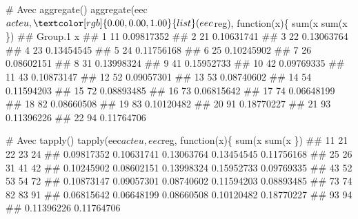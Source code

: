 \documentclass[12pt,twosided, notitlepage]{book}
\newenvironment{Shaded}{}{}
\newcommand{\KeywordTok}[1]{\textcolor[rgb]{0.00,0.00,1.00}{#1}}
\newcommand{\DataTypeTok}[1]{#1}
\newcommand{\StringTok}[1]{\textcolor[rgb]{0.00,0.50,0.50}{#1}}
\newcommand{\CommentTok}[1]{\textcolor[rgb]{0.00,0.50,0.00}{#1}}
\newcommand{\OtherTok}[1]{\textcolor[rgb]{1.00,0.25,0.00}{#1}}
\newcommand{\ControlFlowTok}[1]{\textcolor[rgb]{0.00,0.00,1.00}{#1}}
\newcommand{\OperatorTok}[1]{#1}
\newcommand{\NormalTok}[1]{#1}
\renewenvironment{Shaded}{\begin{snugshade}}{\end{snugshade}}
\begin{document}
\begin{enumerate}
\begin{enumerate}
\begin{Shaded}
\begin{Highlighting}[]
\CommentTok{# Avec aggregate()}
\KeywordTok{aggregate}\NormalTok{(eec}\OperatorTok{$}\NormalTok{acteu, }\KeywordTok{list}\NormalTok{(eec}\OperatorTok{$}\NormalTok{reg), }\ControlFlowTok{function}\NormalTok{(x)\{}
  \KeywordTok{sum}\NormalTok{(x }\OperatorTok{%
\StringTok{    }\KeywordTok{sum}\NormalTok{(x }\OperatorTok{%
\NormalTok{\})}
\NormalTok{  ##    Group.1          x}
\NormalTok{  ## 1       11 0.09817352}
\NormalTok{  ## 2       21 0.10631741}
\NormalTok{  ## 3       22 0.13063764}
\NormalTok{  ## 4       23 0.13454545}
\NormalTok{  ## 5       24 0.11756168}
\NormalTok{  ## 6       25 0.10245902}
\NormalTok{  ## 7       26 0.08602151}
\NormalTok{  ## 8       31 0.13998324}
\NormalTok{  ## 9       41 0.15952733}
\NormalTok{  ## 10      42 0.09769335}
\NormalTok{  ## 11      43 0.10873147}
\NormalTok{  ## 12      52 0.09057301}
\NormalTok{  ## 13      53 0.08740602}
\NormalTok{  ## 14      54 0.11594203}
\NormalTok{  ## 15      72 0.08893485}
\NormalTok{  ## 16      73 0.06815642}
\NormalTok{  ## 17      74 0.06648199}
\NormalTok{  ## 18      82 0.08660508}
\NormalTok{  ## 19      83 0.10120482}
\NormalTok{  ## 20      91 0.18770227}
\NormalTok{  ## 21      93 0.11396226}
\NormalTok{  ## 22      94 0.11764706}

\CommentTok{# Avec tapply()}
\KeywordTok{tapply}\NormalTok{(eec}\OperatorTok{$}\NormalTok{acteu, eec}\OperatorTok{$}\NormalTok{reg, }\ControlFlowTok{function}\NormalTok{(x)\{}
  \KeywordTok{sum}\NormalTok{(x }\OperatorTok{%
\StringTok{    }\KeywordTok{sum}\NormalTok{(x }\OperatorTok{%
\NormalTok{\})}
\NormalTok{  ##         11         21         22         23         24 }
\NormalTok{  ## 0.09817352 0.10631741 0.13063764 0.13454545 0.11756168 }
\NormalTok{  ##         25         26         31         41         42 }
\NormalTok{  ## 0.10245902 0.08602151 0.13998324 0.15952733 0.09769335 }
\NormalTok{  ##         43         52         53         54         72 }
\NormalTok{  ## 0.10873147 0.09057301 0.08740602 0.11594203 0.08893485 }
\NormalTok{  ##         73         74         82         83         91 }
\NormalTok{  ## 0.06815642 0.06648199 0.08660508 0.10120482 0.18770227 }
\NormalTok{  ##         93         94 }
\NormalTok{  ## 0.11396226 0.11764706}

}}}}
\end{Highlighting}
\end{Shaded}
\end{enumerate}
\end{enumerate}
\end{document}
